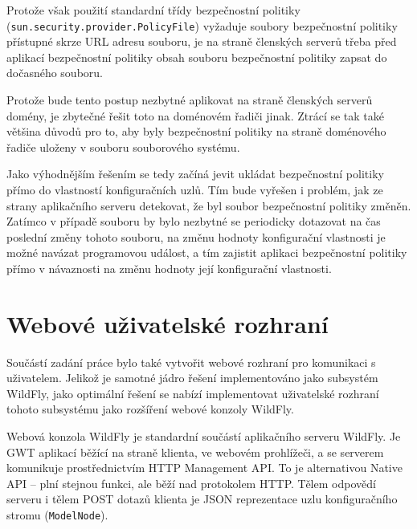Protože však použití standardní třídy bezpečnostní politiky ({\tt sun.security.provider.PolicyFile}) vyžaduje soubory bezpečnostní politiky přístupné skrze URL adresu souboru, je na straně členských serverů třeba před aplikací bezpečnostní politiky obsah souboru bezpečnostní politiky zapsat do dočasného souboru.

Protože bude tento postup nezbytné aplikovat na straně členských serverů domény, je zbytečné řešit toto na doménovém řadiči jinak. Ztrácí se tak také většina důvodů pro to, aby byly bezpečnostní politiky na straně doménového řadiče uloženy v souboru souborového systému.

Jako výhodnějším řešením se tedy začíná jevit ukládat bezpečnostní politiky přímo do vlastností konfiguračních uzlů. Tím bude vyřešen i problém, jak ze strany aplikačního serveru detekovat, že byl soubor bezpečnostní politiky změněn. Zatímco v případě souboru by bylo nezbytné se periodicky dotazovat na čas poslední změny tohoto souboru, na změnu hodnoty konfigurační vlastnosti je možné navázat programovou událost, a tím zajistit aplikaci bezpečnostní politiky přímo v návaznosti na změnu hodnoty její konfigurační vlastnosti.

\section{Webové uživatelské rozhraní} \label{navrhGUI}

Součástí zadání práce bylo také vytvořit webové rozhraní pro komunikaci s uživatelem. Jelikož je samotné jádro řešení implementováno jako subsystém WildFly, jako optimální řešení se nabízí implementovat uživatelské rozhraní tohoto subsystému jako rozšíření webové konzoly WildFly.

Webová konzola WildFly je standardní součástí aplikačního serveru WildFly. Je GWT aplikací běžící na straně klienta, ve webovém prohlížeči, a se serverem komunikuje prostřednictvím HTTP Management API. To je alternativou Native API -- plní stejnou funkci, ale běží nad protokolem HTTP. Tělem odpovědí serveru i tělem POST dotazů klienta je JSON reprezentace uzlu konfiguračního stromu ({\tt ModelNode}). \cite{WildFlyManagementAPIreference}

